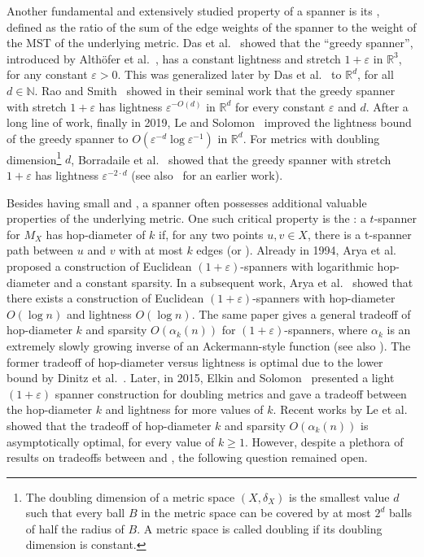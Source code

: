 \documentclass[11pt,english]{article}
\newcommand{\ddim}{d}
\renewcommand{\emph}[1]{{\color{MyGreen}{\em #1}}}
\newcommand{\eps}{\varepsilon}
\begin{document}
Another fundamental and extensively studied property of a spanner is its \emph{lightness}, 
defined as the ratio of the sum of the edge weights of the spanner to the weight of the MST of the underlying metric.
Das et al.~\cite{das1993optimally} showed that the ``greedy spanner'', introduced by Alth\"ofer et al.~\cite{althofer1993sparse}, has a constant lightness and stretch $1+\eps$ in $\mathbb{R}^3$, for any constant $\eps>0$. This was generalized later by Das et al.~\cite{narasimhan1995new} to $\mathbb{R}^d$, for all $d\in \mathbb{N}$. 
Rao and Smith~\cite{rao1998approximating} showed in their seminal work that the greedy spanner with stretch  $1+\eps$ has lightness $\eps^{-O(d)}$ in $\mathbb{R}^d$ for every constant $\eps$ and $d$. 
After a long line of work, finally in 2019, Le and Solomon~\cite{le2019truly} improved the lightness bound of the greedy spanner to $O(\eps^{-d}\log \eps^{-1})$ in $\mathbb{R}^d$. For metrics with doubling dimension\footnote{The doubling dimension of a metric space $(X, \delta_X)$ is the smallest value $\ddim$ such that every ball $B$ in the metric space can be covered by at most $2^{\ddim}$ balls of half the radius of $B$. A metric space is called doubling if its doubling dimension is constant.} 
$\ddim$, Borradaile et al.~\cite{borradaile2019greedy} showed that the greedy spanner with stretch $1+\eps$ has lightness $\eps^{-2\cdot \ddim}$ (see also~\cite{Gottlieb15} for an earlier work).

Besides having small \emph{stretch} and \emph{sparsity}, a spanner often possesses additional valuable properties of the underlying metric.
One such critical property is the \emph{hop-diameter}: a $t$-spanner for $M_X$ has hop-diameter of $k$ if, for any two points $u, v \in X$, there is a t-spanner path between $u$ and $v$ with at most $k$ edges (or \emph{hops}). Already in 1994, Arya et al.~\cite{arya1994randomized} proposed a construction of Euclidean $(1+\eps)$-spanners with logarithmic hop-diameter and a constant sparsity. In a subsequent work, Arya et al.~\cite{arya1995euclidean} showed that there exists a construction of Euclidean $(1+\varepsilon)$-spanners with hop-diameter $O(\log n)$ and lightness $O(\log n)$. The same paper gives a general tradeoff of hop-diameter $k$ and sparsity $O(\alpha_k(n))$ for $(1+\eps)$-spanners, where $\alpha_k$ is an extremely slowly growing inverse of an Ackermann-style function (see also \cite{BTS94,Sol13}). 
The former tradeoff of hop-diameter versus lightness is optimal due to the lower bound by Dinitz et al.~\cite{dinitz2010low}. 
Later, in 2015, Elkin and Solomon~\cite{ES15} presented a light $(1+\eps)$ spanner construction for doubling metrics and gave a tradeoff between the hop-diameter $k$ and lightness for more values of $k$.
Recent works by Le et al.~\cite{LeMS22, LeMS23} showed that the tradeoff of hop-diameter $k$ and sparsity $O(\alpha_k(n))$ is asymptotically optimal, for every value of $k \ge 1$.
However, despite a plethora of results on tradeoffs between \emph{lightness} and \emph{hop-diameter}, the following question remained open.
\end{document}
